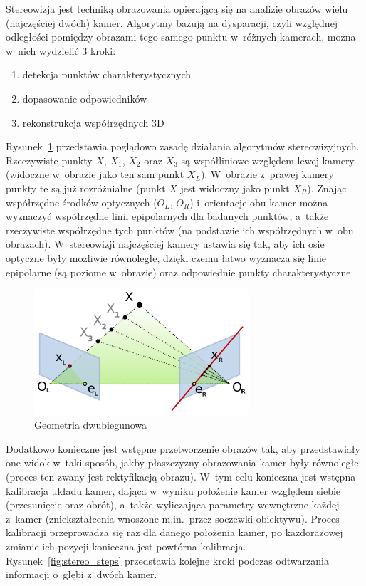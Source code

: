 Stereowizja jest techniką obrazowania opierającą się na analizie obrazów wielu
(najczęściej dwóch) kamer. Algorytmy bazują na dysparacji, czyli względnej
odległości pomiędzy obrazami tego samego punktu w~różnych kamerach, można 
w~nich wydzielić 3 kroki:

\begin{enumerate}
\item detekcja punktów charakterystycznych
\item dopasowanie odpowiedników
\item rekonstrukcja współrzędnych 3D
\end{enumerate}

Rysunek~\ref{fig:epipolar} przedstawia poglądowo zasadę działania algorytmów
stereowizyjnych. Rzeczywiste punkty $X$, $X_1$, $X_2$ oraz $X_3$ są współliniowe
względem lewej kamery (widoczne w~obrazie jako ten sam punkt $X_L$). W~obrazie 
z~prawej kamery punkty te są już rozróżnialne (punkt $X$ jest widoczny jako punkt
$X_R$). Znając współrzędne środków optycznych ($O_L$, $O_R$) i~orientacje obu
kamer można wyznaczyć współrzędne linii epipolarnych dla badanych punktów, 
a~także rzeczywiste współrzędne tych punktów (na podstawie ich współrzędnych 
w~obu obrazach). W~stereowizji najczęściej kamery ustawia się tak, aby ich osie
optyczne były możliwie równoległe, dzięki czemu łatwo wyznacza się linie
epipolarne (są poziome w~obrazie) oraz odpowiednie punkty charakterystyczne.

\begin{figure}[h!]
\centering
\includegraphics[width=8cm]{../../Common/img/Epipolar_geometry}
\caption{Geometria dwubiegunowa}
\label{fig:epipolar}
\end{figure}

Dodatkowo konieczne jest wstępne przetworzenie obrazów tak, aby przedstawiały
one widok w~taki sposób, jakby płaszczyzny obrazowania kamer były równoległe
(proces ten zwany jest rektyfikacją obrazu). W~tym celu konieczna jest wstępna
kalibracja układu kamer, dająca w~wyniku położenie kamer względem siebie
(przesunięcie oraz obrót), a~także wyliczająca parametry wewnętrzne każdej 
z~kamer (zniekształcenia wnoszone m.in.~przez soczewki obiektywu). Proces kalibracji
przeprowadza się raz dla danego położenia kamer, po każdorazowej zmianie ich
pozycji konieczna jest powtórna kalibracja. Rysunek~\ref{fig:stereo_steps}
przedstawia kolejne kroki podczas odtwarzania informacji o~głębi z~dwóch kamer.

